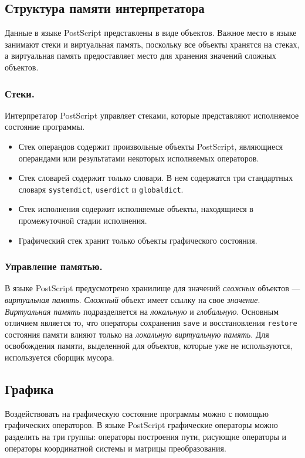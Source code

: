 \subsection{Структура памяти интерпретатора}
Данные в языке PostScript представлены в виде объектов. Важное место в языке занимают стеки и виртуальная память, поскольку все объекты хранятся на стеках, а виртуальная память предоставляет место для хранения значений сложных объектов.
\subsubsection{Стеки.}
Интерпретатор PostScript управляет стеками, которые представляют исполняемое состояние программы. 
\begin{itemize}
\item Стек операндов содержит произвольные объекты PostScript, являющиеся операндами или результатами некоторых исполняемых операторов.
\item Стек словарей содержит только словари. В нем содержатся три стандартных словаря \texttt{systemdict}, \texttt{userdict} и \texttt{globaldict}.
\item Стек исполнения содержит исполняемые объекты, находящиеся в промежуточной стадии исполнения.
\item Графический стек хранит только объекты графического состояния.
\end{itemize}

\subsubsection{Управление памятью.}
В языке PostScript предусмотрено хранилище для значений \textit{сложных} объектов --- \textit{виртуальная память}. \textit{Сложный} объект имеет ссылку на свое \textit{значение}. \textit{Виртуальная память} подразделяется на \textit{локальную} и \textit{глобальную}.
Основным отличием является то, что операторы сохранения \texttt{save} и восстановления \texttt{restore} состояния памяти влияют только на \textit{локальную виртуальную память}. 
Для освобождения памяти, выделенной для объектов, которые уже не используются, используется сборщик мусора. 

\subsection{Графика}
Воздействовать на графическую состояние программы можно с помощью графических операторов. В языке PostScript графические операторы можно разделить на три группы: операторы построения пути, рисующие операторы и операторы координатной системы и матрицы преобразования.

